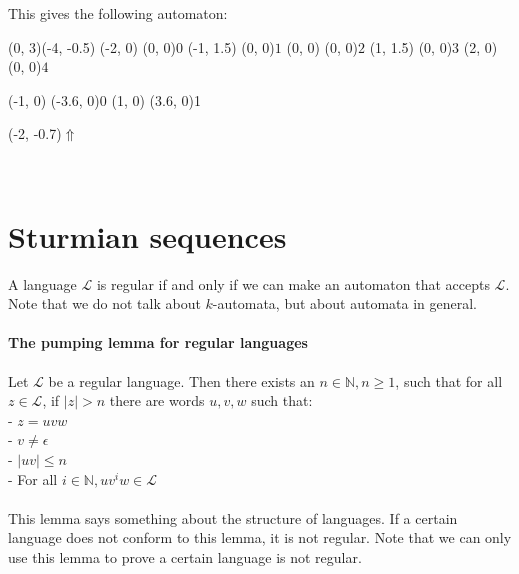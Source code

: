 \documentclass{article}
\begin{document}
This gives the following automaton:\\
\begin{graph}(0, 3)(-4, -0.5)
  (-2, 0) (0, 0){$0$}
  (-1, 1.5) (0, 0){$1$}
  (0, 0) (0, 0){$2$}
  (1, 1.5) (0, 0){$3$}
  (2, 0) (0, 0){$4$}

  (-1, 0) \freetext(-3.6, 0){0}
   
   
   
   
   
   
   
   
  (1, 0) \freetext(3.6, 0){1}
  
  \freetext(-2, -0.7){$\Uparrow$}
\end{graph}\\

\section*{Sturmian sequences}
A language $\mathcal{L}$ is regular if and only if we can make an 
automaton that accepts $\mathcal{L}$. Note that we do not talk about 
$k$-automata, but about automata in general.

\paragraph{The pumping lemma for regular languages} %
Let $\mathcal{L}$ be a regular language. Then there exists an 
$n \in \mathbb{N}, n \ge 1$, such that for all $z \in \mathcal{L}$, if 
$|z| > n$ there are words $u, v, w$ such that:\\
- $z = uvw$\\
- $v \ne \epsilon$\\
- $|uv| \le n$\\
- For all $i \in \mathbb{N}, uv^iw \in \mathcal{L}$\\
\\
This lemma says something about the structure of languages. If a certain 
language does not conform to this lemma, it is not regular. Note that we can
only use this lemma to prove a certain language is not regular.
\end{document}
